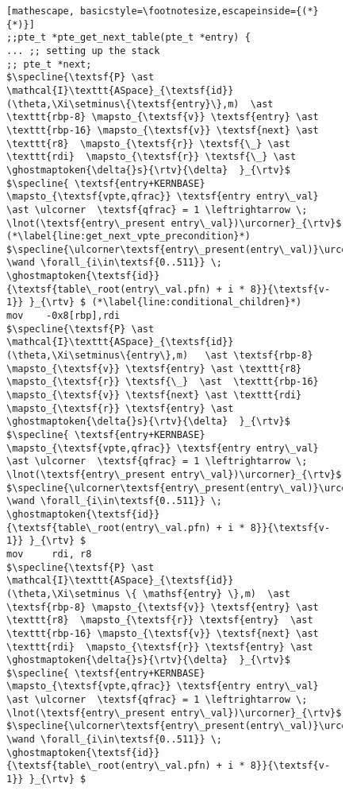 \begin{figure}%
\begin{lstlisting}[mathescape, basicstyle=\footnotesize,escapeinside={(*}{*)}]
;;pte_t *pte_get_next_table(pte_t *entry) {
... ;; setting up the stack
;; pte_t *next;
$\specline{\textsf{P} \ast \mathcal{I}\texttt{ASpace}_{\textsf{id}}(\theta,\Xi\setminus\{\textsf{entry}\},m)  \ast \texttt{rbp-8} \mapsto_{\textsf{v}} \textsf{entry} \ast  \texttt{rbp-16} \mapsto_{\textsf{v}} \textsf{next} \ast \texttt{r8}  \mapsto_{\textsf{r}} \textsf{\_} \ast \texttt{rdi}  \mapsto_{\textsf{r}} \textsf{\_} \ast \ghostmaptoken{\delta{}s}{\rtv}{\delta}  }_{\rtv}$
$\specline{ \textsf{entry+KERNBASE} \mapsto_{\textsf{vpte,qfrac}} \textsf{entry entry\_val} \ast \ulcorner  \textsf{qfrac} = 1 \leftrightarrow \; \lnot(\textsf{entry\_present entry\_val})\urcorner}_{\rtv}$ (*\label{line:get_next_vpte_precondition}*)
$\specline{\ulcorner\textsf{entry\_present(entry\_val)}\urcorner \wand \forall_{i\in\textsf{0..511}} \; \ghostmaptoken{\textsf{id}}{\textsf{table\_root(entry\_val.pfn) + i * 8}}{\textsf{v-1}} }_{\rtv} $ (*\label{line:conditional_children}*)
mov    -0x8[rbp],rdi
$\specline{\textsf{P} \ast \mathcal{I}\texttt{ASpace}_{\textsf{id}}(\theta,\Xi\setminus\{entry\},m)   \ast \textsf{rbp-8} \mapsto_{\textsf{v}} \textsf{entry} \ast \texttt{r8}  \mapsto_{\textsf{r}} \textsf{\_}  \ast  \texttt{rbp-16} \mapsto_{\textsf{v}} \textsf{next} \ast \texttt{rdi}  \mapsto_{\textsf{r}} \textsf{entry} \ast \ghostmaptoken{\delta{}s}{\rtv}{\delta}  }_{\rtv}$
$\specline{ \textsf{entry+KERNBASE} \mapsto_{\textsf{vpte,qfrac}} \textsf{entry entry\_val} \ast \ulcorner  \textsf{qfrac} = 1 \leftrightarrow \; \lnot(\textsf{entry\_present entry\_val})\urcorner}_{\rtv}$
$\specline{\ulcorner\textsf{entry\_present(entry\_val)}\urcorner \wand \forall_{i\in\textsf{0..511}} \; \ghostmaptoken{\textsf{id}}{\textsf{table\_root(entry\_val.pfn) + i * 8}}{\textsf{v-1}} }_{\rtv} $
mov     rdi, r8
$\specline{\textsf{P} \ast \mathcal{I}\texttt{ASpace}_{\textsf{id}}(\theta,\Xi\setminus \{ \mathsf{entry} \},m)  \ast \textsf{rbp-8} \mapsto_{\textsf{v}} \textsf{entry} \ast \texttt{r8}  \mapsto_{\textsf{r}} \textsf{entry}  \ast  \texttt{rbp-16} \mapsto_{\textsf{v}} \textsf{next} \ast \texttt{rdi}  \mapsto_{\textsf{r}} \textsf{entry} \ast \ghostmaptoken{\delta{}s}{\rtv}{\delta}  }_{\rtv}$
$\specline{ \textsf{entry+KERNBASE} \mapsto_{\textsf{vpte,qfrac}} \textsf{entry entry\_val} \ast \ulcorner  \textsf{qfrac} = 1 \leftrightarrow \; \lnot(\textsf{entry\_present entry\_val})\urcorner}_{\rtv}$
$\specline{\ulcorner\textsf{entry\_present(entry\_val)}\urcorner \wand \forall_{i\in\textsf{0..511}} \; \ghostmaptoken{\textsf{id}}{\textsf{table\_root(entry\_val.pfn) + i * 8}}{\textsf{v-1}} }_{\rtv} $

\end{lstlisting}
\end{figure}
